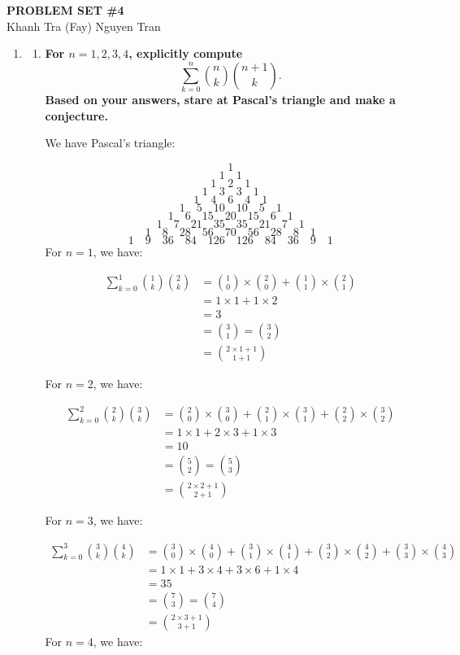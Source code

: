 \documentclass[10pt]{article}
\begin{document}
\begin{center}
\textbf{PROBLEM SET \#4}\\
Khanh Tra (Fay) Nguyen Tran
\end{center}

\begin{enumerate}

\item
\begin{enumerate}
\item
\textbf{For $n=1, 2, 3, 4$, explicitly compute
$$\sum\limits_{k=0}^n\binom{n}{k}\binom{n+1}{k}.$$
Based on your answers, stare at Pascal's triangle and make a conjecture.}

We have Pascal's triangle:

$$1$$
$$1 \quad 1$$
$$1\quad 2\quad 1$$
$$1\quad 3\quad 3\quad 1$$
$$1\quad 4\quad 6\quad 4\quad 1$$
$$1\quad 5 \quad 10\quad 10 \quad 5\quad 1$$
$$1\quad 6 \quad 15\quad 20 \quad 15\quad 6 \quad 1$$
$$1\quad 7 \quad 21\quad 35 \quad 35\quad 21 \quad 7 \quad 1$$
$$1\quad 8 \quad 28 \quad 56 \quad 70 \quad 56 \quad 28 \quad 8 \quad 1$$
$$1\quad 9 \quad 36 \quad 84 \quad 126 \quad 126 \quad 84 \quad 36 \quad 9 \quad 1$$
For $n = 1$, we have:

\begin{align*}
    \sum\limits_{k=0}^1\binom{1}{k}\binom{2}{k} &= \binom{1}{0} \times \binom{2}{0} + \binom{1}{1} \times \binom{2}{1} \\  
    &= 1 \times 1 + 1 \times 2\\
    &= 3 \\
    &= \binom{3}{1} =  \binom{3}{2} \\
    &= \binom{2 \times 1 + 1}{1 + 1} 
\end{align*}

For $n = 2$, we have:

\begin{align*}
    \sum\limits_{k=0}^2\binom{2}{k}\binom{3}{k} &= \binom{2}{0} \times \binom{3}{0} + \binom{2}{1} \times \binom{3}{1} + \binom{2}{2} \times \binom{3}{2}\\
    &= 1 \times 1 + 2 \times 3 + 1 \times 3\\
    &= 10 \\
    &= \binom{5}{2} =  \binom{5}{3} \\
    &= \binom{2 \times 2 + 1}{2 + 1} 
\end{align*}

For $n = 3$, we have:

\begin{align*}
    \sum\limits_{k=0}^3\binom{3}{k}\binom{4}{k} &= \binom{3}{0} \times \binom{4}{0} + \binom{3}{1} \times \binom{4}{1} + \binom{3}{2} \times \binom{4}{2} + \binom{3}{3} \times \binom{4}{3}\\
    &= 1 \times 1 + 3 \times 4 +  3 \times 6 + 1 \times 4\\
    &= 35 \\
    &= \binom{7}{3} =  \binom{7}{4} \\
    &= \binom{2 \times 3 + 1}{3 + 1}
\end{align*}
For $n = 4$, we have:


\end{enumerate}
\end{enumerate}
\end{document}

